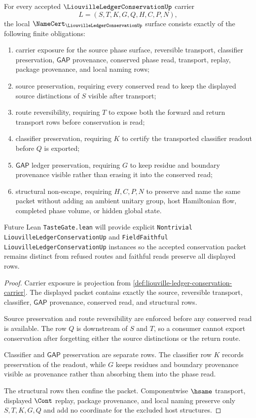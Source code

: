 \begin{theorem}
\label{thm:liouville-ledger-conservation-namecert-obligations}
For every accepted $\LiouvilleLedgerConservationUp$ carrier
$$
L=(S,T,K,G,Q,H,C,P,N),
$$
the local $\NameCert_{\LiouvilleLedgerConservationUp}$ surface consists exactly of the following finite obligations:
\begin{enumerate}
\item carrier exposure for the source phase surface, reversible transport, classifier preservation, $\mathsf{GAP}$ provenance, conserved phase read, transport, replay, package provenance, and local naming rows;
\item source preservation, requiring every conserved read to keep the displayed source distinctions of $S$ visible after transport;
\item route reversibility, requiring $T$ to expose both the forward and return transport rows before conservation is read;
\item classifier preservation, requiring $K$ to certify the transported classifier readout before $Q$ is exported;
\item $\mathsf{GAP}$ ledger preservation, requiring $G$ to keep residue and boundary provenance visible rather than erasing it into the conserved read;
\item structural non-escape, requiring $H,C,P,N$ to preserve and name the same packet without adding an ambient unitary group, host Hamiltonian flow, completed phase volume, or hidden global state.
\end{enumerate}
Future Lean \texttt{TasteGate.lean} will provide explicit \texttt{Nontrivial LiouvilleLedgerConservationUp} and \texttt{FieldFaithful LiouvilleLedgerConservationUp} instances so the accepted conservation packet remains distinct from refused routes and faithful reads preserve all displayed rows.
\end{theorem}
\begin{proof}
Carrier exposure is projection from \autoref{def:liouville-ledger-conservation-carrier}. The displayed packet contains exactly the source, reversible transport, classifier, $\mathsf{GAP}$ provenance, conserved read, and structural rows.

Source preservation and route reversibility are enforced before any conserved read is available. The row $Q$ is downstream of $S$ and $T$, so a consumer cannot export conservation after forgetting either the source distinctions or the return route.

Classifier and $\mathsf{GAP}$ preservation are separate rows. The classifier row $K$ records preservation of the readout, while $G$ keeps residues and boundary provenance visible as provenance rather than absorbing them into the phase read.

The structural rows then confine the packet. Componentwise $\hsame$ transport, displayed $\Cont$ replay, package provenance, and local naming preserve only $S,T,K,G,Q$ and add no coordinate for the excluded host structures.
\end{proof}

